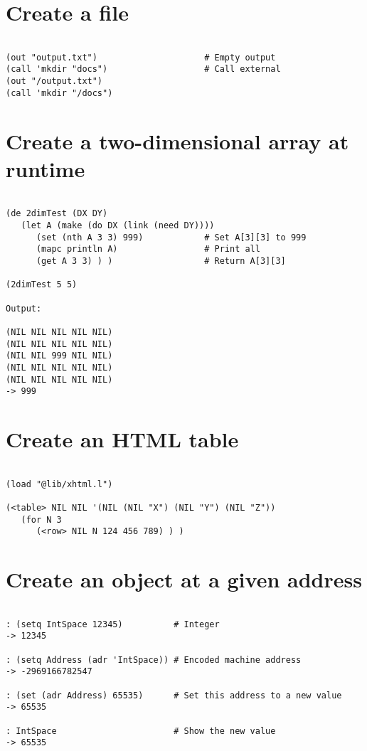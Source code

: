 \section*{Create a file}

\begin{verbatim}

(out "output.txt")                     # Empty output
(call 'mkdir "docs")                   # Call external
(out "/output.txt")
(call 'mkdir "/docs")

\end{verbatim}

\section*{Create a two-dimensional array at runtime}

\begin{verbatim}

(de 2dimTest (DX DY)
   (let A (make (do DX (link (need DY))))
      (set (nth A 3 3) 999)            # Set A[3][3] to 999
      (mapc println A)                 # Print all
      (get A 3 3) ) )                  # Return A[3][3]

(2dimTest 5 5)

Output:

(NIL NIL NIL NIL NIL)
(NIL NIL NIL NIL NIL)
(NIL NIL 999 NIL NIL)
(NIL NIL NIL NIL NIL)
(NIL NIL NIL NIL NIL)
-> 999

\end{verbatim}

\section*{Create an HTML table}

\begin{verbatim}

(load "@lib/xhtml.l")

(<table> NIL NIL '(NIL (NIL "X") (NIL "Y") (NIL "Z"))
   (for N 3
      (<row> NIL N 124 456 789) ) )

\end{verbatim}

\section*{Create an object at a given address}

\begin{verbatim}

: (setq IntSpace 12345)          # Integer
-> 12345

: (setq Address (adr 'IntSpace)) # Encoded machine address
-> -2969166782547

: (set (adr Address) 65535)      # Set this address to a new value
-> 65535

: IntSpace                       # Show the new value
-> 65535

\end{verbatim}

